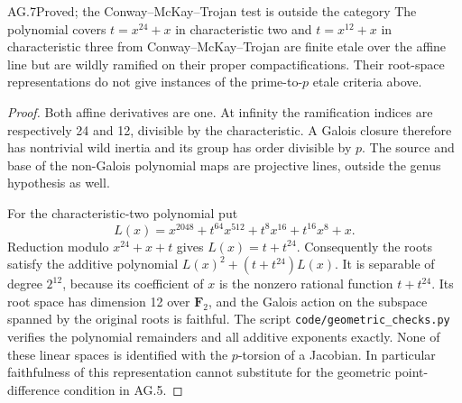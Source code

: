 \begin{claim}{AG.7}{Proved; the Conway--McKay--Trojan test is outside the category}
The polynomial covers $t=x^{24}+x$ in characteristic two and
$t=x^{12}+x$ in characteristic three from
Conway--McKay--Trojan \cite{AG_CMT2008} are finite etale over
the affine line but are wildly ramified on their proper
compactifications. Their root-space representations do not
give instances of the prime-to-$p$ etale criteria above.
\end{claim}
\begin{proof}
Both affine derivatives are one. At infinity the ramification
indices are respectively 24 and 12, divisible by the
characteristic. A Galois closure therefore has nontrivial
wild inertia and its group has order divisible by $p$.
The source and base of the non-Galois polynomial maps are
projective lines, outside the genus hypothesis as well.

For the characteristic-two polynomial put
\[
 L(x)=x^{2048}+t^{64}x^{512}+t^8x^{16}+t^{16}x^8+x.
\]
Reduction modulo $x^{24}+x+t$ gives $L(x)=t+t^{24}$.
Consequently the roots satisfy the additive polynomial
$L(x)^2+(t+t^{24})L(x)$. It is separable of degree $2^{12}$,
because its coefficient of $x$ is the nonzero rational
function $t+t^{24}$. Its root space has dimension 12 over
$\mathbf F_2$, and the Galois action on the subspace spanned
by the original roots is faithful. The script
\texttt{code/geometric\_checks.py} verifies the polynomial
remainders and all additive exponents exactly. None of these
linear spaces is identified with the $p$-torsion of a
Jacobian. In particular faithfulness of this representation
cannot substitute for the geometric point-difference
condition in AG.5.
\end{proof}

